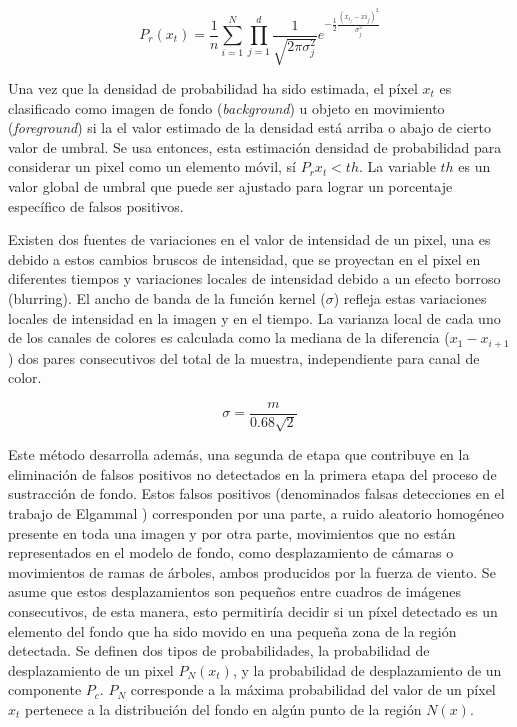 \begin{equation} \label{eq:kernel_estimation}
P_r{(x_t)} = \frac{1}{n} \sum_{i=1}^{N} \prod_{j=1}^{d} \frac{1}{\sqrt{2\pi\sigma_{j}^{2}}} e^{-\frac{1}{2}\frac{(x_{t_j}-x{i_j})^2}{\sigma_{j}^{2}}}
\end{equation}

Una vez que la densidad de probabilidad ha sido estimada, el píxel $x_t$ es clasificado como imagen de fondo (\textit{background}) u objeto en movimiento (\textit{foreground}) si la el valor estimado de la densidad está arriba o abajo de cierto valor de umbral. Se usa entonces, esta estimación densidad de probabilidad para considerar un pixel como un elemento móvil, sí $P_r{x_t} < th$. La variable $th$ es un valor global de umbral que puede ser ajustado para lograr un porcentaje específico de falsos positivos. 

Existen dos fuentes de variaciones en el valor de intensidad de un pixel, una es debido a estos cambios bruscos de intensidad, que se proyectan en el pixel en diferentes tiempos y variaciones locales de intensidad debido a un efecto borroso (blurring). El ancho de banda de la función kernel ($\sigma$) refleja estas variaciones locales de intensidad en la imagen y en el tiempo. La varianza local de cada uno de los canales de colores es calculada como la mediana de la diferencia ($x_1-x_{i+1}$) dos pares consecutivos del total de la muestra, independiente para canal de color.

\begin{equation}\label{eq:median}
\sigma = \frac{m}{0.68\sqrt{2}}
\end{equation}


Este método desarrolla además, una segunda de etapa que contribuye en la eliminación de falsos positivos no detectados en la primera etapa del proceso de sustracción de fondo. Estos falsos positivos (denominados falsas detecciones en el trabajo de Elgammal \cite{elgammal_nonparametricmodel_2000}) corresponden por una parte, a ruido aleatorio homogéneo presente en toda una imagen y por otra parte, movimientos que no están representados en el modelo de fondo, como desplazamiento de cámaras o movimientos de ramas de árboles, ambos producidos por la fuerza de viento. Se asume que estos desplazamientos son pequeños entre cuadros de imágenes consecutivos, de esta manera, esto permitiría decidir si un píxel detectado es un elemento del fondo que ha sido movido en una pequeña zona de la región detectada. Se definen dos tipos de probabilidades, la probabilidad de desplazamiento de un pixel $P_N{(x_t)}$, y la probabilidad de desplazamiento de un componente $P_c$. $P_N$ corresponde a la máxima probabilidad del valor de un píxel $x_t$ pertenece a la distribución del fondo en algún punto de la región $N(x)$. 

